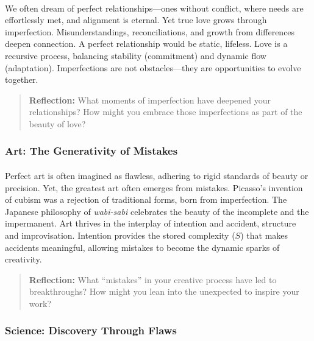 \documentclass[12pt]{article}
\begin{document}
\paragraph{}
We often dream of perfect relationships—ones without conflict, where needs are effortlessly met, and alignment is eternal. Yet true love grows through imperfection. Misunderstandings, reconciliations, and growth from differences deepen connection. A perfect relationship would be static, lifeless. Love is a recursive process, balancing stability (commitment) and dynamic flow (adaptation). Imperfections are not obstacles—they are opportunities to evolve together.

\begin{quote}
\textbf{Reflection:}  
What moments of imperfection have deepened your relationships? How might you embrace those imperfections as part of the beauty of love?
\end{quote}

\subsubsection{Art: The Generativity of Mistakes}
\paragraph{}
Perfect art is often imagined as flawless, adhering to rigid standards of beauty or precision. Yet, the greatest art often emerges from mistakes. Picasso’s invention of cubism was a rejection of traditional forms, born from imperfection. The Japanese philosophy of \textit{wabi-sabi} celebrates the beauty of the incomplete and the impermanent. Art thrives in the interplay of intention and accident, structure and improvisation. Intention provides the stored complexity (\(S\)) that makes accidents meaningful, allowing mistakes to become the dynamic sparks of creativity.

\begin{quote}
\textbf{Reflection:}  
What “mistakes” in your creative process have led to breakthroughs? How might you lean into the unexpected to inspire your work?
\end{quote}

\subsubsection{Science: Discovery Through Flaws}
\end{document}
